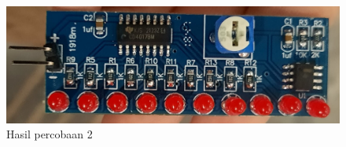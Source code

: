 \begin{figure}[H]
  \centering
  \includegraphics[width=0.7\linewidth]{img/modul_2/percobaan2_hasil.jpg}
  \caption{Hasil percobaan 2 \label{fig:inisub1}}
\end{figure}